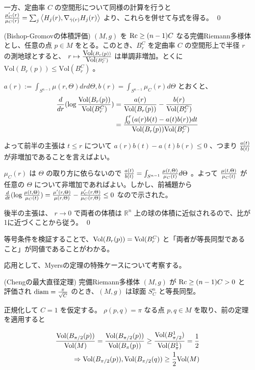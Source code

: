 \documentclass[dvipdfmx,a4paper]{jsreport}
\theoremstyle{definition}
\newcommand{\Vol}{{\rm Vol}}
\newcommand{\Rc}{{\rm Rc}}
\newcommand{\R}{\mathbb{R}}
\begin{document}
一方、定曲率 $C$ の空間形について同様の計算を行うと ${\mu'_C(r) \over \mu_C(r)}=\sum_j \ev{H_j(r),\nabla_{\dot{\gamma}(r)}H_j(r)}$ より、これらを併せて与式を得る。 \qed

\thm\label{thmbishop} (Bishop-Gromovの体積評価) $(M,g)$ を $\Rc \geq (n-1)C$ なる完備Riemann多様体とし、任意の点 $p \in M$ をとる。このとき、$B_r^C$ を定曲率 $C$ の空間形上で半径 $r$ の測地球とすると、 $r \mapsto {\mbox{Vol}(B_r(p)) \over \mbox{Vol}(B_r^C)}$ は単調非増加。とくに $\mbox{Vol}(B_r(p)) \leq \mbox{Vol}(B_r^C)$ 。

\prf $a(r):=\int_{S^{n-1}}\mu(r,\Theta)drd\Theta,b(r)=\int_{S^{n-1}}\mu_C(r)d\Theta$ とおくと、
\begin{align*}
    {d \over dr}(\log {\mbox{Vol}(B_r(p)) \over \mbox{Vol}(B_r^C)}) &= {a(r) \over \mbox{Vol}(B_r(p))}-{b(r) \over \mbox{Vol}(B_r^C)} \\
    &= {\int_0^r (a(r)b(t)-a(t)b(r))dt \over \mbox{Vol}(B_r(p))\mbox{Vol}(B_r^C)}
\end{align*}

よって前半の主張は $t \leq r$ について $a(r)b(t)-a(t)b(r) \leq 0$ 、つまり ${a(t) \over b(t)}$ が非増加であることを言えばよい。

$\mu_C(r)$ は $\Theta$ の取り方に依らないので ${a(t) \over b(t)}=\int_{S^{n-1}} {\mu(t,\Theta) \over \mu_C(t)}d\Theta$ 。よって ${\mu(t,\Theta) \over \mu_C(t)}$ が任意の $\Theta$ について非増加であればよい。しかし、前補題から ${d \over dt}(\log {\mu(t,\Theta) \over \mu_C(t)}) ={\mu'(r,\Theta) \over \mu(r,\Theta)}-{\mu_C'(r,\Theta) \over \mu_C(r,\Theta)} \leq 0$ なので示された。

後半の主張は、 $r \to 0$ で両者の体積は $\R^n$ 上の球の体積に近似されるので、比が1に近づくことから従う。 \qed 

等号条件を検証することで、$\Vol(B_r(p))=\Vol(B_r^C)$ と「両者が等長同型であること」が同値であることがわかる。

応用として、Myersの定理の特殊ケースについて考察する。

\thm\label{thmcheng} (Chengの最大直径定理) 完備Riemann多様体 $(M,g)$ が $\Rc \geq (n-1)C>0$ と評価され $\mbox{diam}={\pi \over \sqrt{C}}$ のとき、$(M,g)$ は球面 $S_C^n$ と等長同型。

\prf 正規化して $C=1$ を仮定する。 $\rho(p,q)=\pi$ なる点 $p,q\in M$ を取り、前の定理を適用すると

\begin{align*}
    {\Vol(B_{\pi/2}(p)) \over \Vol(M)}={\Vol(B_{\pi/2}(p)) \over \Vol(B_\pi(p))} \geq {\Vol(B^1_{\pi/2}) \over \Vol(B^1_{\pi})}={1 \over 2} \\
    \Rightarrow \Vol(B_{\pi/2}(p)),\Vol(B_{\pi/2}(q)) \geq {1 \over 2}\Vol(M)
\end{align*}
\end{document}
